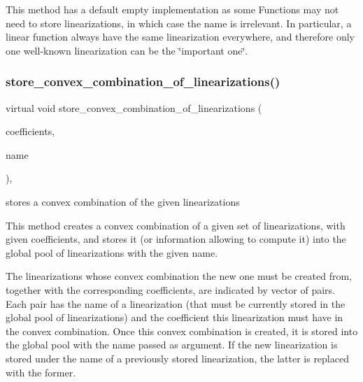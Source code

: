 This method has a default empty implementation as some Functions may not need to store linearizations, in which case the name is irrelevant. In particular, a linear function always have the same linearization everywhere, and therefore only one well-\/known linearization can be the \char`\"{}important one\char`\"{}. \mbox{\label{class_s_m_spp__di__unipi__it_1_1_c05_function_aa711d56d6e59b22f499eb0486df87699}} 
\subsubsection{\texorpdfstring{store\+\_\+convex\+\_\+combination\+\_\+of\+\_\+linearizations()}{store\_convex\_combination\_of\_linearizations()}}
{\footnotesize\ttfamily virtual void store\+\_\+convex\+\_\+combination\+\_\+of\+\_\+linearizations (\begin{DoxyParamCaption}\item[{\mbox{\hyperlink{class_s_m_spp__di__unipi__it_1_1_c05_function_a70544540af2063e1072dfaed40270109}{Linear\+Combination}}}]{coefficients,  }\item[{const \mbox{\hyperlink{class_s_m_spp__di__unipi__it_1_1_c05_function_ae90bf93c6d4b4ada66791c735d1c03cc}{Linearization\+Name}}}]{name }\end{DoxyParamCaption})\hspace{0.3cm}{\ttfamily [inline]}, {\ttfamily [virtual]}}



stores a convex combination of the given linearizations 

This method creates a convex combination of a given set of linearizations, with given coefficients, and stores it (or information allowing to compute it) into the global pool of linearizations with the given name.

The linearizations whose convex combination the new one must be created from, together with the corresponding coefficients, are indicated by vector of pairs. Each pair has the name of a linearization (that must be currently stored in the global pool of linearizations) and the coefficient this linearization must have in the convex combination. Once this convex combination is created, it is stored into the global pool with the name passed as argument. If the new linearization is stored under the name of a previously stored linearization, the latter is replaced with the former.

